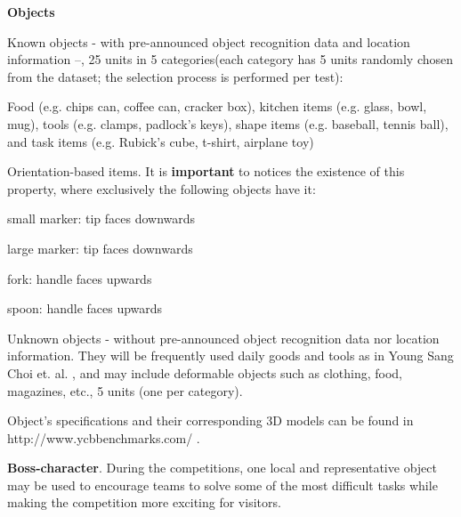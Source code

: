 \documentclass{article}
\newcommand{\SubItem}[1]{
    {\setlength\itemindent{15pt} \item[-] #1}
}
\begin{document}
\textbf{Objects}
\begin{itemize}
    \item Known objects - with pre-announced object recognition data and location information --, 25 units in 5 categories\footnotemark (each category has 5 units randomly chosen from the dataset; the selection process is performed per test): 
        \SubItem{Food (e.g. chips can, coffee can, cracker box), kitchen items (e.g. glass, bowl, mug), tools (e.g. clamps, padlock's keys), shape items (e.g. baseball, tennis ball), and task items (e.g. Rubick’s cube, t-shirt, airplane toy)}
    \item Orientation-based items. It is \textbf{important} to notices the existence of this property, where exclusively the following objects have it: 
        \SubItem{small marker: tip faces downwards}
        \SubItem{large marker: tip faces downwards}
        \SubItem{fork: handle faces upwards}
        \SubItem{spoon: handle faces upwards}
    \item Unknown objects - without pre-announced object recognition data nor location information. They will be frequently used daily goods and tools as in Young Sang Choi et. al. \footnotemark, and may include deformable objects such as clothing, food, magazines, etc., 5 units (one per category). 
\end{itemize}




Object's specifications and their corresponding 3D models can be found in http://www.ycbbenchmarks.com/ .

\textbf{Boss-character}. During the competitions, one local and representative object may be used to encourage teams to solve some of the most difficult tasks while making the competition more exciting for visitors.\\
\end{document}
